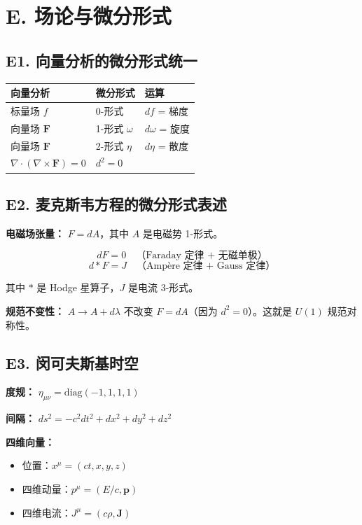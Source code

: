 \section{E. 场论与微分形式}

\subsection{E1. 向量分析的微分形式统一}

\begin{center}
\begin{tabular}{lll}
\toprule
\textbf{向量分析} & \textbf{微分形式} & \textbf{运算} \\
\midrule
标量场 $f$ & 0-形式 & $df$ = 梯度 \\
向量场 $\mathbf{F}$ & 1-形式 $\omega$ & $d\omega$ = 旋度 \\
向量场 $\mathbf{F}$ & 2-形式 $\eta$ & $d\eta$ = 散度 \\
$\nabla \cdot (\nabla \times \mathbf{F}) = 0$ & $d^2 = 0$ & \\
\bottomrule
\end{tabular}
\end{center}

\subsection{E2. 麦克斯韦方程的微分形式表述}

\textbf{电磁场张量：} $F = dA$，其中 $A$ 是电磁势 1-形式。

\[
dF = 0 \quad \text{（Faraday 定律 + 无磁单极）}
\]
\[
d{*}F = J \quad \text{（Ampère 定律 + Gauss 定律）}
\]

其中 $*$ 是 Hodge 星算子，$J$ 是电流 3-形式。

\textbf{规范不变性：} $A \to A + d\lambda$ 不改变 $F = dA$（因为 $d^2 = 0$）。这就是 $U(1)$ 规范对称性。

\subsection{E3. 闵可夫斯基时空}

\textbf{度规：} $\eta_{\mu\nu} = \text{diag}(-1, 1, 1, 1)$

\textbf{间隔：} $ds^2 = -c^2 dt^2 + dx^2 + dy^2 + dz^2$

\textbf{四维向量：}
\begin{itemize}
  \item 位置：$x^\mu = (ct, x, y, z)$
  \item 四维动量：$p^\mu = (E/c, \mathbf{p})$
  \item 四维电流：$J^\mu = (c\rho, \mathbf{J})$
\end{itemize}

